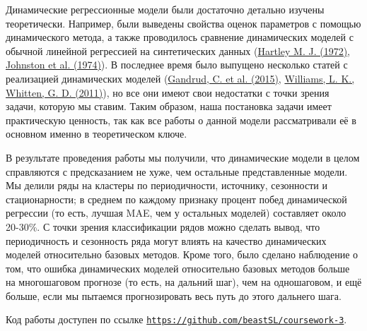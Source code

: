 \documentclass[a4paper,14pt]{extarticle}
\newcommand{\bibref}[3]{\hyperlink{#1}{#2 (#3)}} %
\begin{document}
Динамические регрессионные модели были достаточно детально изучены теоретически. Например, были выведены свойства оценок параметров с помощью динамического метода, а также проводилось сравнение динамических моделей с обычной линейной регрессией на синтетических данных (\bibref{hartley72}{Hartley M. J.}{1972}, \bibref{johnston74}{Johnston et al.}{1974}). В последнее время было выпущено несколько статей с реализацией динамических моделей (\bibref{gandrud15}{Gandrud, C. et al.}{2015}, \bibref{williams11}{Williams, L. K., Whitten, G. D.}{2011}), но все они имеют свои недостатки с точки зрения задачи, которую мы ставим. Таким образом, наша постановка задачи имеет практическую ценность, так как все работы о данной модели рассматривали её в основном именно в теоретическом ключе.

В результате проведения работы мы получили, что динамические модели в целом справляются с предсказанием не хуже, чем остальные представленные модели. Мы делили ряды на кластеры по периодичности, источнику, сезонности и стационарности; в среднем по каждому признаку процент побед динамической регрессии (то есть, лучшая MAE, чем у остальных моделей) составляет около 20-30\%. С точки зрения классификации рядов можно сделать вывод, что периодичность и сезонность ряда могут влиять на качество динамических моделей относительно базовых методов. Кроме того, было сделано наблюдение о том, что ошибка динамических моделей относительно базовых методов больше на многошаговом прогнозе (то есть, на дальний шаг), чем на одношаговом, и ещё больше, если мы пытаемся прогнозировать весь путь до этого дальнего шага.

Код работы доступен по ссылке \href{https://github.com/beastSL/coursework-3}{\texttt{https://github.com/beastSL/coursework-3}}.
\end{document}
